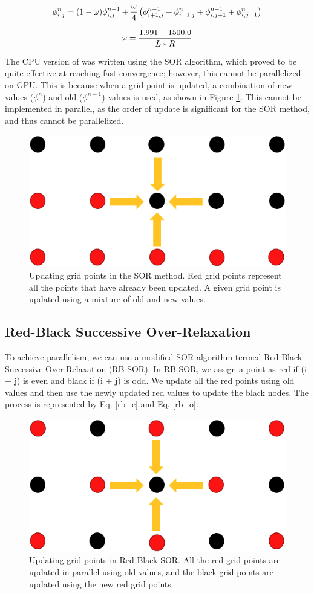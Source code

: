 \begin{equation}{\label{sor_eq}}
 \phi_{i,j}^{n} = (1-\omega)\phi^{n-1}_{i,j} + \frac{\omega}{4} \left(\phi^{n-1}_{i+1,j} + \phi^n_{i-1,j} + \phi^{n-1}_{i,j+1} + \phi^n_{i,j-1} \right)
\end{equation}

\begin{equation}{\label{omg}}
\omega = \frac{1.991 - 1500.0}{L*R}
\end{equation}

The CPU version of {\ehd} was written using the SOR algorithm, which proved to be quite effective at reaching fast convergence; however, this cannot be parallelized on GPU. This is because when a grid point is updated, a combination of new values ($\phi^{n}$) and old ($\phi^{n-1}$) values is used, as shown in Figure \ref{fig:sor_methods}. This cannot be implemented in parallel, as the order of update is significant for the SOR method, and thus cannot be parallelized.


\begin{figure}[!htb]
\centering
 \vspace{0.2cm}
\includegraphics[width=0.4\linewidth]{ch4/figs/SOR.png}
\vspace{0.3cm}
\caption{\label{fig:sor_methods} Updating grid points in the SOR method. Red grid points represent all the points that have already been updated. A given grid point is updated using a mixture of old and new values.}
\end{figure}

\subsection*{Red-Black Successive Over-Relaxation}
To achieve parallelism, we can use a modified SOR algorithm termed Red-Black Successive Over-Relaxation (RB-SOR). In RB-SOR, we assign a point as red if (i + j) is even and black if (i + j) is odd. We update all the red points using old values and then use the newly updated red values to update the black nodes. The process is represented by Eq. \ref{rb_e} and Eq. \ref{rb_o}.


\begin{figure}[!htb]
\centering
 \vspace{0.2cm}
 \includegraphics[width=0.4\linewidth]{ch4/figs/RB-SOR.png}
 \vspace{0.3cm}
\caption{\label{fig:rb_sor_methods} Updating grid points in Red-Black SOR. All the red grid points are updated in parallel using old values, and the black grid points are updated using the new red grid points.}
\end{figure}

